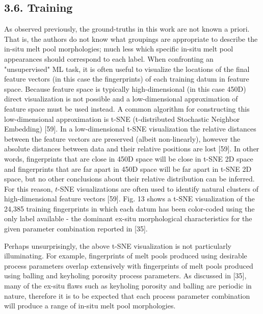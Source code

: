 \documentclass[10pt]{article}
\begin{document}
\subsection*{3.6. Training}
As observed previously, the ground-truths in this work are not known a priori. That is, the authors do not know what groupings are appropriate to describe the in-situ melt pool morphologies; much less which specific in-situ melt pool appearances should correspond to each label. When confronting an "unsupervised" ML task, it is often useful to visualize the locations of the final feature vectors (in this case the fingerprints) of each training datum in feature space. Because feature space is typically high-dimensional (in this case 450D) direct visualization is not possible and a low-dimensional approximation of feature space must be used instead. A common algorithm for constructing this low-dimensional approximation is t-SNE (t-distributed Stochastic Neighbor Embedding) [59]. In a low-dimensional t-SNE visualization the relative distances between the feature vectors are preserved (albeit non-linearly), however the absolute distances between data and their relative positions are lost [59]. In other words, fingerprints that are close in 450D space will be close in t-SNE 2D space and fingerprints that are far apart in 450D space will be far apart in t-SNE 2D space, but no other conclusions about their relative distribution can be inferred. For this reason, $t$-SNE visualizations are often used to identify natural clusters of high-dimensional feature vectors [59]. Fig. 13 shows a t-SNE visualization of the 24,385 training fingerprints in which each datum has been color-coded using the only label available - the dominant ex-situ morphological characteristics for the given parameter combination reported in [35].

Perhaps unsurprisingly, the above t-SNE visualization is not particularly illuminating. For example, fingerprints of melt pools produced using desirable process parameters overlap extensively with fingerprints of melt pools produced using balling and keyholing porosity process parameters. As discussed in [35], many of the ex-situ flaws such as keyholing porosity and balling are periodic in nature, therefore it is to be expected that each process parameter combination will produce a range of in-situ melt pool morphologies.
\end{document}
